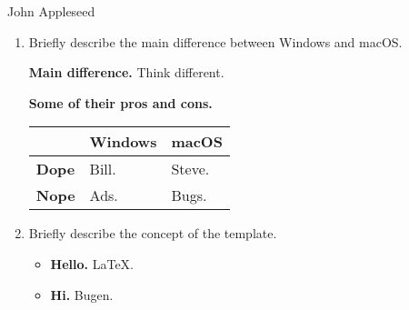 \documentclass[12pt,a4paper]{article}
\theoremstyle{definition}
\begin{document}
\begin{CJK}{UTF8}{gbsn}
\noindent

\noindent{}
\begin{center}

John Appleseed   
\end{center}

\begin{enumerate}[itemsep=15pt]
    
    \item
    Briefly describe the main difference between Windows and macOS.
    
    \textbf{Main difference.} Think different.  
    
    \textbf{Some of their pros and cons.}
    
\begin{table}[!htbp]
\label{tab:arch-vs}
\centering
\begin{tabular}{lp{6cm}p{6cm}}
\hline
                & Windows                                                                        & macOS                                                                              \\ \hline
\textbf{Dope}       & Bill.   & Steve. \\
\textbf{Nope}    & Ads.   & Bugs. \\
\hline
\end{tabular}
\end{table}
    
    \item
    Briefly describe the concept of the template.
    
    \begin{itemize}
        \item \textbf{Hello.} \LaTeX .
        \item \textbf{Hi.} Bugen.
    \end{itemize}
    
   \end{enumerate}

\vspace{20pt}
\end{CJK}
\end{document}
